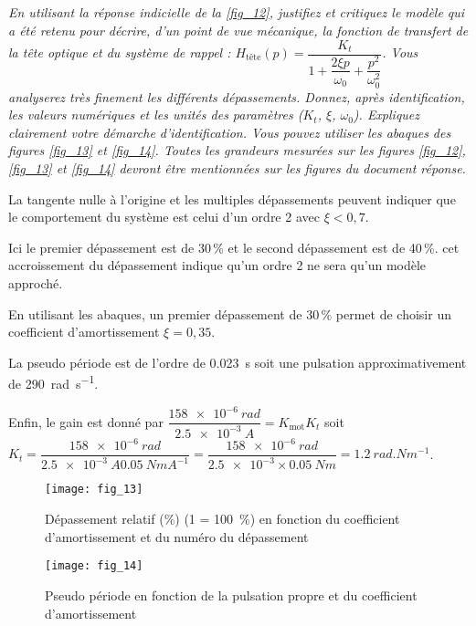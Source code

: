 \subparagraph{\label{q_10}}\textit{En utilisant la réponse indicielle de la \autoref{fig_12}, justifiez et critiquez le modèle qui a été retenu pour décrire, d’un point de vue mécanique, la fonction de transfert de la tête optique et du système de rappel :
$H_{\text{tête}}(p)=\dfrac{K_t}{1+\dfrac{2\xi p}{\omega_0}+\dfrac{p^2}{\omega_0^2}}$. Vous analyserez très finement les différents dépassements. Donnez, après identification, les valeurs numériques et les unités des paramètres ($K_t$, $\xi$, $\omega_0$).
Expliquez clairement votre démarche d’identification. Vous pouvez utiliser les abaques des figures
\autoref{fig_13} et \autoref{fig_14}. Toutes les grandeurs mesurées sur les figures \autoref{fig_12}, \autoref{fig_13} et \autoref{fig_14} devront être mentionnées sur les
figures du document réponse.}
\ifprof
\begin{corrige}
La tangente nulle à l'origine et les multiples dépassements peuvent indiquer que le comportement du système est celui d'un ordre 2 avec $\xi<0,7$.

Ici le premier dépassement est de 30\,\% et le second dépassement est de 40\,\%. cet accroissement du dépassement indique qu'un ordre 2 ne sera qu'un modèle approché. 

En utilisant les abaques, un premier dépassement de 30\,\% permet de choisir un coefficient d'amortissement $\xi =0,35$. 

La pseudo période est de l'ordre de \SI{0,023}{s} soit une pulsation approximativement de \SI{290}{rad.s^{-1}}.

Enfin, le gain est donné  par $ \dfrac{ \SI{158e-6}{rad}}{\SI{2,5e-3}{A}}=K_{\text{mot}} K_t $ soit 
$  K_t = \dfrac{ \SI{158e-6}{rad}}{\SI{2,5e-3}{A}\SI{0,05}{NmA^{-1}}}= \dfrac{ \SI{158e-6}{rad}}{\num{2,5e-3}\times \SI{0,05}{Nm}} =\SI{1,2}{rad.Nm^{-1}}$.
\end{corrige}
\else
\fi

\begin{minipage}[c]{.47\linewidth}
\begin{figure}[H]
\centering
\texttt{[image: fig\_13]}
\caption{\label{fig_13} Dépassement relatif (\%) (1 = 100~\%) en fonction
du coefficient d’amortissement et du numéro du dépassement}
\end{figure}
\end{minipage}\hfill
\begin{minipage}[c]{.47\linewidth}
\begin{figure}[H]
\centering
\texttt{[image: fig\_14]}
\caption{\label{fig_14} Pseudo période en fonction de la pulsation
propre et du coefficient d’amortissement}
\end{figure}
\end{minipage}

